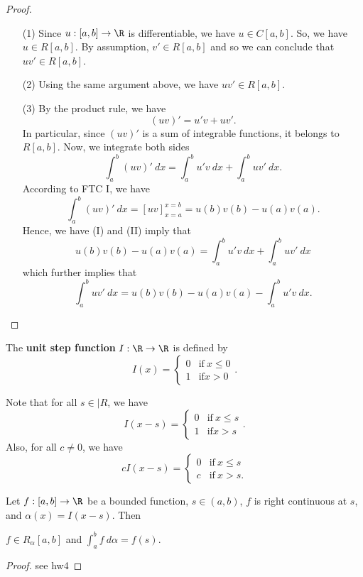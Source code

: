 \begin{proof}
\begin{enumerate}
    \item[(1)] Since \( u:[a,b] \to \R  \) is differentiable, we have \( u \in C[a,b] \). So, we have \( u \in R[a,b] \). By assumption, \( v' \in R[a,b] \) and so we can conclude that \( uv' \in R[a,b] \).
    \item[(2)] Using the same argument above, we have \( uv' \in R[a,b] \).
    \item[(3)] By the product rule, we have 
        \[  (uv)' = u' v + u v'. \]
        In particular, since \( (uv)' \) is a sum of integrable functions, it belongs to \( R[a,b] \). Now, we integrate both sides 
        \[  \int_{ a }^{ b }  (uv)'   \ dx = \int_{ a }^{ b } u'v \ dx + \int_{ a }^{ b }  uv' \ dx. \tag{I} \]
        According to FTC I, we have
        \[  \int_{ a }^{ b } (uv)'  \ dx = [uv]_{x = a}^{x =b} = u(b)v(b) - u(a)v(a). \tag{II} \]
        Hence, we have (I) and (II) imply that
        \[  u(b)v(b) - u(a)v(a) = \int_{ a }^{ b } u'v \ dx + \int_{ a }^{ b }  u v' \ dx \]
        which further implies that 
        \[  \int_{ a }^{ b } uv' \ dx = u(b)v(b) - u(a)v(a) - \int_{ a }^{ b } u'v \ dx. \]
\end{enumerate}
\end{proof}

\begin{definition}
    The \textbf{unit step function} \( I: \R \to \R  \) is defined by
    \[  I(x) = 
    \begin{cases}
        0 &\text{if} \ x \leq 0 \\
        1 &\text{if} x > 0 
    \end{cases}. \]
\end{definition}

\begin{remark}
    Note that for all \( s \in |R  \), we have 
    \[  I(x-s) = 
    \begin{cases}
        0 &\text{if} \ x \leq s \\
        1 &\text{if} x > s 
    \end{cases}. \]
    Also, for all \( c \neq 0  \), we have
    \[  c I(x-s) = 
    \begin{cases}
        0 &\text{if} \ x \leq s \\
        c &\text{if} \ x > s.
    \end{cases} \]
\end{remark}

\begin{theorem}[Rudin 6.15]
    Let \( f: [a,b] \to \R  \) be a bounded function, \( s \in (a,b) \), \( f  \) is right continuous at \( s  \), and \( \alpha(x) = I(x-s) \). Then 
    \begin{center}
    \( f \in {R}_{\alpha}[a,b] \) and \( \displaystyle \int_{ a }^{ b }  f  \ d \alpha  = f(s) \).
    \end{center}
\end{theorem}
\begin{proof}
see hw4
\end{proof}

